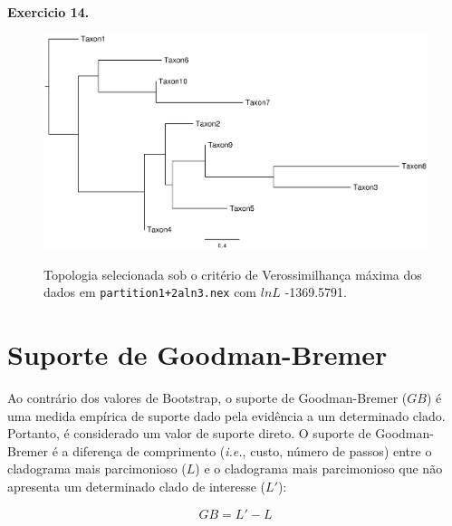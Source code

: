 \begin{refsection}
\begin{blackBlock}{\textbf{Exercicio 14.}}
\end{blackBlock}





  \begin{figure}[h!]
      {\includegraphics[scale=0.65]{figures/tut14/garlirunbest.eps}}
	{\caption[Topologia de verossimilhançca para \texttt{partition1+2aln3.nex}.]{Topologia selecionada sob o critério de Verossimilhança máxima dos dados em \texttt{partition1+2aln3.nex} com  $lnL$ -1369.5791.}\label{tut14:fig:treml}}

  \end{figure}



\section{Suporte de Goodman-Bremer}\label{tut14:bremer}

Ao contrário dos valores de Bootstrap, o suporte de Goodman-Bremer ($GB$) \parencite{GoodmanETAL1982,Bremer1988} é uma medida empírica de suporte dado pela evidência a um determinado clado. Portanto, é considerado um valor de suporte direto. O suporte de Goodman-Bremer é a diferença de comprimento (\textit{i.e.}, custo, número de passos) entre o cladograma mais parcimonioso ($L$) e o cladograma mais parcimonioso que não apresenta um determinado clado de interesse ($L'$):

\begin{center}
\begin{equation}
GB=L'-L
\end{equation}
\end{center}


\end{refsection}
